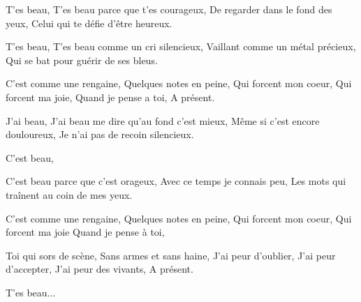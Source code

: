 

T'es beau,
T'es beau parce que t'es courageux,
De regarder dans le fond des yeux,
Celui qui te défie d'être heureux.


T'es beau,
T'es beau comme un cri silencieux,
Vaillant comme un métal précieux,
Qui se bat pour guérir de ses bleus.

C'est comme une rengaine,
Quelques notes en peine,
Qui forcent mon coeur,
Qui forcent ma joie,
Quand je pense a toi,
A présent.

J'ai beau,
J'ai beau me dire qu'au fond c'est mieux,
Même si c'est encore douloureux,
Je n'ai pas de recoin silencieux.

C'est beau,

C'est beau parce que c'est orageux,
Avec ce temps je connais peu,
Les mots qui traînent au coin de mes yeux.

C'est comme une rengaine,
Quelques notes en peine,
Qui forcent mon coeur,
Qui forcent ma joie
Quand je pense à  toi,

Toi qui sors de scène,
Sans armes et sans haine,
J'ai peur d'oublier,
J'ai peur d'accepter,
J'ai peur des vivants,
A présent.

T'es beau... 
